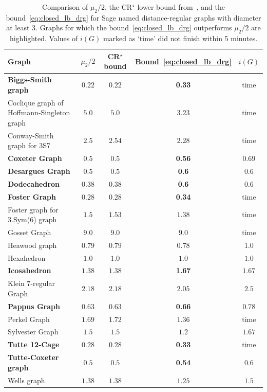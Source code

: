 \documentclass[a4paper,11pt]{article}
\theoremstyle{definition}
\begin{document}
\begin{table}[H]
    \centering
    \begin{tabular}{l|cccc}
    Graph & $\mu_2/2$ & CR$^\star$ bound & Bound~\eqref{eq:closed_lb_drg} & $i(G)$ \\
    \hline
    \textbf{Biggs-Smith graph} & $0.22$ & $0.22$ & \textbf{0.33} & time \\
    Coclique graph of Hoffmann-Singleton graph & $5.0$ & $5.0$ & $3.23$ & time \\
    Conway-Smith graph for 3S7 & $2.5$ & $2.54$ & $2.28$ & time \\
    \textbf{Coxeter Graph} & $0.5$ & $0.5$ & \textbf{0.56} & $0.69$ \\
    \textbf{Desargues Graph} & $0.5$ & $0.5$ & \textbf{0.6} & $0.6$ \\
    \textbf{Dodecahedron} & $0.38$ & $0.38$ & \textbf{0.6} & $0.6$ \\
    \textbf{Foster Graph} & $0.28$ & $0.28$ & \textbf{0.34} & time \\
    Foster graph for 3.Sym(6) graph & $1.5$ & $1.53$ & $1.38$ & time \\
    Gosset Graph & $9.0$ & $9.0$ & $9.0$ & time \\
    Heawood graph & $0.79$ & $0.79$ & $0.78$ & $1.0$ \\
    Hexahedron & $1.0$ & $1.0$ & $1.0$ & $1.0$ \\
    \textbf{Icosahedron} & $1.38$ & $1.38$ & \textbf{1.67} & $1.67$ \\
    Klein 7-regular Graph & $2.18$ & $2.18$ & $2.05$ & $2.5$ \\
    \textbf{Pappus Graph} & $0.63$ & $0.63$ & \textbf{0.66} & $0.78$ \\
    Perkel Graph & $1.69$ & $1.72$ & $1.36$ & time \\
    Sylvester Graph & $1.5$ & $1.5$ & $1.2$ & $1.67$ \\
    \textbf{Tutte 12-Cage} & $0.28$ & $0.28$ & \textbf{0.33} & time \\
    \textbf{Tutte-Coxeter graph} & $0.5$ & $0.5$ & \textbf{0.54} & $0.6$ \\
    Wells graph & $1.38$ & $1.38$ & $1.25$ & $1.5$ \\
    \end{tabular}
    \caption{Comparison of $\mu_2/2$, the CR$^\star$ lower bound from~\cite{DM2019}, and the bound~\eqref{eq:closed_lb_drg} for Sage named distance-regular graphs with diameter at least 3. Graphs for which the bound~\eqref{eq:closed_lb_drg} outperforms $\mu_2/2$ are highlighted. Values of $i(G)$ marked as `time' did not finish within 5 minutes.}
    \label{tab:t5_drg}
\end{table}
\end{document}
